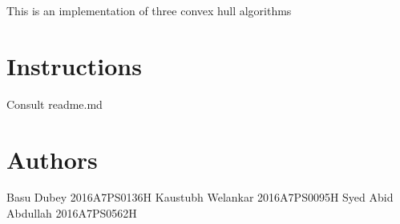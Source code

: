 This is an implementation of three convex hull algorithms \hypertarget{index_Instructions}{}\section{Instructions}\label{index_Instructions}
Consult readme.\+md \hypertarget{index_Authors}{}\section{Authors}\label{index_Authors}
\begin{DoxyVerb}Basu Dubey          2016A7PS0136H
Kaustubh Welankar       2016A7PS0095H
Syed Abid Abdullah  2016A7PS0562H
\end{DoxyVerb}
 